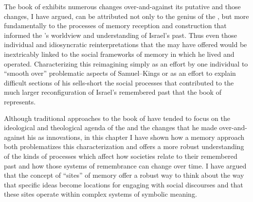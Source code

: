 The book of \chronicles exhibits numerous changes over-and-against its putative \vorlage and those changes, I have argued, can be attributed not only to the genius of the \chronicler, but more fundamentally to the processes of memory reception and construction that informed the \chronicler's worldview and understanding of Israel's past. Thus even those individual and idiosyncratic reinterpretations that the \chronicler may have offered would be inextricably linked to the social frameworks of memory in which he lived and operated. Characterizing this reimagining simply as an effort by one individual to ``smooth over'' problematic aspects of Samuel--Kings or as an effort to explain difficult sections of his \vorlage sells-short the social processes that contributed to the much larger reconfiguration of Israel's remembered past that the book of \chronicles represents.

Although traditional approaches to the book of \chronicles have tended to focus on the ideological and theological agenda of the \chronicler and the changes that he made over-and-against his \vorlage as innovations, in this chapter I have shown how a memory approach both problematizes this characterization and offers a more robust understanding of the kinds of processes which affect how societies relate to their remembered past and how those systems of remembrance can change over time. I have argued that the concept of ``sites'' of memory offer a robust way to think about the way that specific ideas become locations for engaging with social discourses and that these sites operate within complex systems of symbolic meaning.